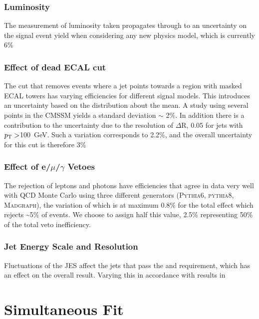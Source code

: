\subsubsection{Luminosity}
The measurement of luminosity taken propagates through to an uncertainty on the signal event yield when considering any new physics model, which is currently 6\%~\cite{EWK-11-001}
\subsubsection{Effect of dead ECAL cut}
The cut that removes events where a jet points towards a region with masked ECAL towers has varying efficiencies for different signal models. This introduces an uncertainty based on the distribution about the mean. A study using several points in the CMSSM yields a standard deviation $\sim$ 2\%. In addition there is a contribution to the uncertainty due to the resolution of $\Delta$R, 0.05 for jets with ${p_{\text T}} >$100~GeV. Such a variation corresponds to 2.2\%, and the overall uncertainty for this cut is therefore 3\%
\subsubsection{Effect of e/$\mu$/$\gamma$ Vetoes}
The rejection of leptons and photons have efficiencies that agree in data very well with QCD Monte Carlo using three different generators (\textsc{Pythia6, pythia8, Madgraph}), the variation of which is at maximum 0.8\% for the total effect which rejects \sim 5\% of events. We choose to assign half this value, 2.5\% representing 50\% of the total veto inefficiency.

\subsubsection{Jet Energy Scale and Resolution}
Fluctuations of the JES affect the jets that pass the \Pt and \HT requirement, which has an effect on the overall result. Varying this in accordance with results in \cite{}

\section{Simultaneous Fit}


